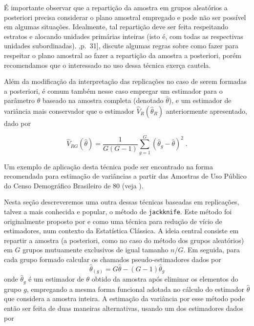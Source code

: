\documentclass[]{book}
\numberwithin{example}{chapter}
\numberwithin{remark}{chapter}
\numberwithin{definition}{chapter}
\begin{document}
É importante observar que a repartição da amostra em grupos aleatórios a
posteriori precisa considerar o plano amostral empregado e pode não ser
possível em algumas situações. Idealmente, tal repartição deve ser feita
respeitando estratos e alocando unidades primárias inteiras (isto é, com
todas as respectivas unidades subordinadas). \citep{W85},p.~31{]},
discute algumas regras sobre como fazer para respeitar o plano amostral
ao fazer a repartição da amostra a posteriori, porém recomendamos que o
interessado no uso dessa técnica exerça cautela.

Além da modificação da interpretação das replicações no caso de serem
formadas a posteriori, é comum também nesse caso empregar um estimador
para o parâmetro \(\theta\) baseado na amostra completa (denotado
\(\widehat{\theta }\)), e um estimador de variância mais conservador que
o estimador \(\widehat{V}_{R}\left( \widehat{\theta }_{R}\right)\)
anteriormente apresentado, dado por

\begin{equation}
\widehat{V}_{RG}\left( \widehat{\theta }\right) =\frac{1}{G\left( G-1\right) 
}\sum_{g=1}^{G}\left( \widehat{\theta }_{g}-\widehat{\theta }\right) ^{2}\;.
\label{eq:estpa25}
\end{equation}

Um exemplo de aplicação desta técnica pode ser encontrado na forma
recomendada para estimação de variâncias a partir das Amostras de Uso
Público do Censo Demográfico Brasileiro de 80 (veja \citep{IBGE85}).

Nesta seção descreveremos uma outra dessas técnicas baseadas em
replicações, talvez a mais conhecida e popular, o método de
\texttt{jackknife}. Este método foi originalmente proposto por
\citep{Queno49} e \citep{Queno56} como uma técnica para redução de vício
de estimadores, num contexto da Estatística Clássica. A ideia central
consiste em repartir a amostra (a posteriori, como no caso do método dos
grupos aleatórios) em \(G\) grupos mutuamente exclusivos de igual
tamanho \(n/G\). Em seguida, para cada grupo formado calcular os
chamados pseudo-estimadores dados por \[
\widehat{\theta }_{\left( g\right) }=G\widehat{\theta }-\left( G-1\right) 
\widehat{\theta }_{g} 
\] onde \(\widehat{\theta }_{g}\) é um estimador de \(\theta\) obtido da
amostra após eliminar os elementos do grupo \(g\), empregando a mesma
forma funcional adotada no cálculo do estimador \(\widehat{\theta}\) que
considera a amostra inteira. A estimação da variância por esse método
pode então ser feita de duas maneiras alternativas, usando um dos
estimadores dados por
\end{document}
